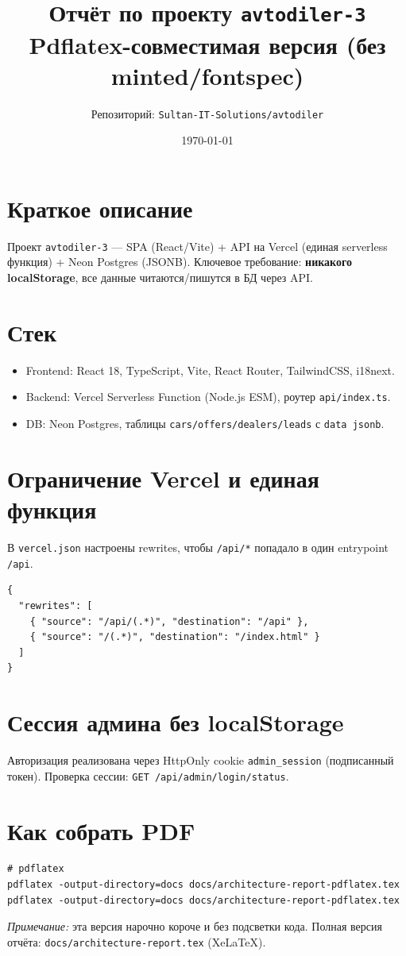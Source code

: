 \documentclass[12pt,a4paper]{article}
\title{\textbf{Отчёт по проекту \texttt{avtodiler-3}}\\[4pt]
\large Pdflatex-совместимая версия (без minted/fontspec)}
\author{Репозиторий: \texttt{Sultan-IT-Solutions/avtodiler}}
\date{\today}
\begin{document}
\maketitle

\tableofcontents
\newpage

\section{Краткое описание}
Проект \texttt{avtodiler-3} --- SPA (React/Vite) + API на Vercel (единая serverless функция) + Neon Postgres (JSONB).
Ключевое требование: \textbf{никакого localStorage}, все данные читаются/пишутся в БД через API.

\section{Стек}
\begin{itemize}[leftmargin=18pt]
  \item Frontend: React 18, TypeScript, Vite, React Router, TailwindCSS, i18next.
  \item Backend: Vercel Serverless Function (Node.js ESM), роутер \texttt{api/index.ts}.
  \item DB: Neon Postgres, таблицы \texttt{cars/offers/dealers/leads} с \texttt{data jsonb}.
\end{itemize}

\section{Ограничение Vercel и единая функция}
В \texttt{vercel.json} настроены rewrites, чтобы \texttt{/api/*} попадало в один entrypoint \texttt{/api}.

\begin{verbatim}
{
  "rewrites": [
    { "source": "/api/(.*)", "destination": "/api" },
    { "source": "/(.*)", "destination": "/index.html" }
  ]
}
\end{verbatim}

\section{Сессия админа без localStorage}
Авторизация реализована через HttpOnly cookie \texttt{admin\_session} (подписанный токен). Проверка сессии: \texttt{GET /api/admin/login/status}.

\section{Как собрать PDF}
\begin{verbatim}
# pdflatex
pdflatex -output-directory=docs docs/architecture-report-pdflatex.tex
pdflatex -output-directory=docs docs/architecture-report-pdflatex.tex
\end{verbatim}

\textit{Примечание:} эта версия нарочно короче и без подсветки кода. Полная версия отчёта: \texttt{docs/architecture-report.tex} (XeLaTeX).
\end{document}
